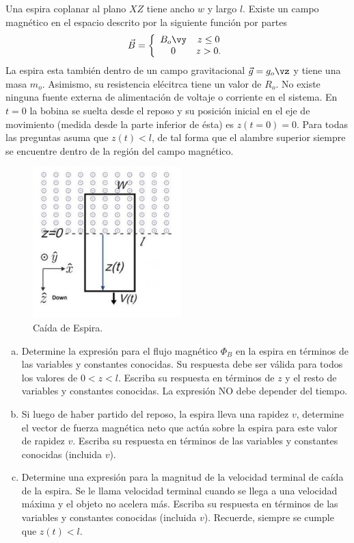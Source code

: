 \begin{mdframed}[style=warning]
	\begin{ejercicio}
		Una espira coplanar al plano $XZ$ tiene ancho $w$ y largo $l$. Existe un campo magnético en el espacio descrito por la siguiente función por partes
			$$
				\vec{B} = \left\{\begin{array}{cc}
					B_o \vy & z \leq 0 \\
					0 & z > 0.
				\end{array}\right.
			$$
		La espira esta también dentro de un campo gravitacional $\vec{g} = g_o \vz$ y tiene una masa $m_o$. Asimismo, su resistencia elécitrca tiene un valor de $R_o$. No existe ninguna fuente externa de alimentación de voltaje o corriente en el sistema. En $t = 0$ la bobina se suelta desde el reposo y su posición inicial en el eje de movimiento (medida desde la parte inferior de ésta) es $z(t = 0) = 0$. Para todas las preguntas asuma que $z(t) < l$, de tal forma que el alambre superior siempre se encuentre dentro de la región del campo magnético.
		\begin{figure}[H]
			\centering
			\includegraphics[scale=0.5]{./img/fall.png}
			\caption{Caída de Espira.}
			\label{DF}	
		\end{figure}
		\begin{enumerate}[a)]
			\item Determine la expresión para el flujo magnético $\Phi _B$ en la espira en términos de las variables y constantes conocidas. Su respuesta debe ser válida para todos los valores de $0 < z < l$. Escriba su respuesta en términos de $z$ y el resto de variables y constantes conocidas. La expresión NO debe depender del tiempo.
			\item Si luego de haber partido del reposo, la espira lleva una rapidez $v$, determine el vector de fuerza magnética neto que actúa sobre la espira para este valor de rapidez $v$. Escriba su respuesta en términos de las variables y constantes conocidas (incluida $v$).
			\item Determine una expresión para la magnitud de la velocidad terminal de caída de la espira. Se le llama velocidad terminal cuando se llega a una velocidad máxima y el objeto no acelera más. Escriba su respuesta en términos de las variables y constantes conocidas (incluida $v$). Recuerde, siempre se cumple que $z(t) < l$.
		\end{enumerate}
	\end{ejercicio}
\end{mdframed}
